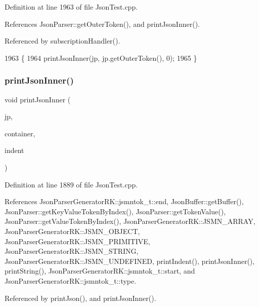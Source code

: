 Definition at line 1963 of file Json\+Test.\+cpp.



References Json\+Parser\+::get\+Outer\+Token(), and print\+Json\+Inner().



Referenced by subscription\+Handler().


\begin{DoxyCode}
1963                                \{
1964     printJsonInner(jp, jp.getOuterToken(), 0);
1965 \}
\end{DoxyCode}
\mbox{\label{_json_test_8cpp_a7a86f133587ae90abe048be568db828f}} 
\subsubsection{print\+Json\+Inner()}
{\footnotesize\ttfamily void print\+Json\+Inner (\begin{DoxyParamCaption}\item[{\textbf{ Json\+Parser} \&}]{jp,  }\item[{const \textbf{ Json\+Parser\+Generator\+R\+K\+::jsmntok\+\_\+t} $\ast$}]{container,  }\item[{size\+\_\+t}]{indent }\end{DoxyParamCaption})}



Definition at line 1889 of file Json\+Test.\+cpp.



References Json\+Parser\+Generator\+R\+K\+::jsmntok\+\_\+t\+::end, Json\+Buffer\+::get\+Buffer(), Json\+Parser\+::get\+Key\+Value\+Token\+By\+Index(), Json\+Parser\+::get\+Token\+Value(), Json\+Parser\+::get\+Value\+Token\+By\+Index(), Json\+Parser\+Generator\+R\+K\+::\+J\+S\+M\+N\+\_\+\+A\+R\+R\+AY, Json\+Parser\+Generator\+R\+K\+::\+J\+S\+M\+N\+\_\+\+O\+B\+J\+E\+CT, Json\+Parser\+Generator\+R\+K\+::\+J\+S\+M\+N\+\_\+\+P\+R\+I\+M\+I\+T\+I\+VE, Json\+Parser\+Generator\+R\+K\+::\+J\+S\+M\+N\+\_\+\+S\+T\+R\+I\+NG, Json\+Parser\+Generator\+R\+K\+::\+J\+S\+M\+N\+\_\+\+U\+N\+D\+E\+F\+I\+N\+ED, print\+Indent(), print\+Json\+Inner(), print\+String(), Json\+Parser\+Generator\+R\+K\+::jsmntok\+\_\+t\+::start, and Json\+Parser\+Generator\+R\+K\+::jsmntok\+\_\+t\+::type.



Referenced by print\+Json(), and print\+Json\+Inner().


